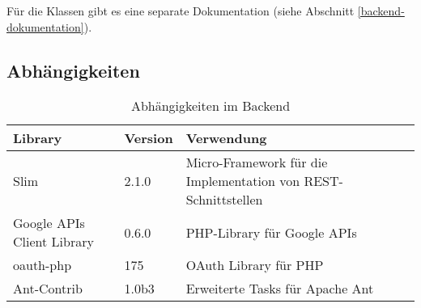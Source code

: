Für die Klassen gibt es eine separate Dokumentation (siehe Abschnitt \ref{backend-dokumentation}).

\subsection{Abhängigkeiten}
\label{backend-abhaengigkeiten}

\begin{table}[H]
\centering
\begin{tabular}{|p{0.35\threecelltabwidth}|p{0.15\threecelltabwidth}|p{0.50\threecelltabwidth}|}
\hline 
\textbf{Library} & \textbf{Version} & \textbf{Verwendung} \\
\hline 
Slim & 2.1.0 & Micro-Framework für die Implementation von \gls{REST}-Schnittstellen \\
\hline 
Google APIs Client Library & 0.6.0 & PHP-Library für Google \glspl{API} \\
\hline 
oauth-php & 175 & OAuth Library für PHP \\
\hline 
Ant-Contrib & 1.0b3 & Erweiterte Tasks für Apache Ant \\
\hline 
\end{tabular}
\caption{Abhängigkeiten im Backend}
\label{table-backend-dependencies}
\end{table}

